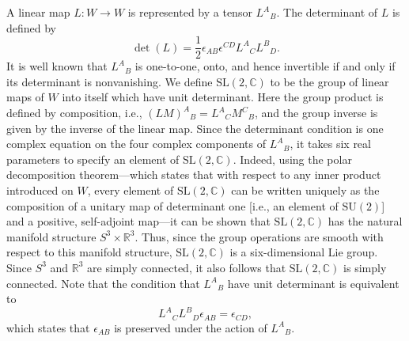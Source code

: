 A linear map \(L:W\longrightarrow W\) is represented by a tensor \(L^A{}_B\). The
determinant of \(L\) is defined by
\begin{equation}
  \det(L)=\frac12\epsilon_{AB}\epsilon^{CD}L^A{}_CL^B{}_D.
  \tag{13.1.8}\label{eq:13.1.8}
\end{equation}
It is well known that \(L^A{}_B\) is one-to-one, onto, and hence invertible if and
only if its determinant is nonvanishing. We define \(\mathrm{SL}(2,\mathbb C)\) to
be the group of linear maps of \(W\) into itself which have unit determinant. Here
the group product is defined by composition, i.e.,
\((LM)^A{}_B=L^A{}_CM^C{}_B\), and the group inverse is given by the inverse of the
linear map. Since the determinant condition is one complex equation on the four
complex components of \(L^A{}_B\), it takes six real parameters to specify an
element of \(\mathrm{SL}(2,\mathbb C)\). Indeed, using the polar decomposition
theorem---which states that with respect to any inner product introduced on \(W\),
every element of \(\mathrm{SL}(2,\mathbb C)\) can be written uniquely as the
composition of a unitary map of determinant one [i.e., an element of
\(\mathrm{SU}(2)\)] and a positive, self-adjoint map---it can be shown that
\(\mathrm{SL}(2,\mathbb C)\) has the natural manifold structure
\(S^3\times\mathbb R^3\). Thus, since the group operations are smooth with respect
to this manifold structure, \(\mathrm{SL}(2,\mathbb C)\) is a six-dimensional Lie
group. Since \(S^3\) and \(\mathbb R^3\) are simply connected, it also follows that
\(\mathrm{SL}(2,\mathbb C)\) is simply connected. Note that the condition that
\(L^A{}_B\) have unit determinant is equivalent to
\begin{equation}
  L^A{}_CL^B{}_D\epsilon_{AB}=\epsilon_{CD},
  \tag{13.1.9}\label{eq:13.1.9}
\end{equation}
which states that \(\epsilon_{AB}\) is preserved under the action of \(L^A{}_B\).

